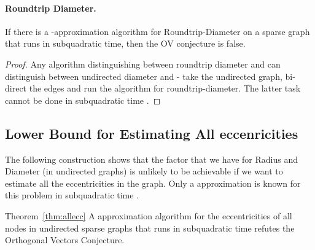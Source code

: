 \paragraph{Roundtrip Diameter.}

\begin{lemma}
\label{lem:RoundDiam}
If there is a -approximation algorithm for Roundtrip-Diameter on a sparse graph that runs in subquadratic time, then the OV conjecture is false.
\end{lemma}

\begin{proof}
Any algorithm distinguishing between roundtrip diameter  and  can distinguish between undirected diameter  and  - take the undirected graph, bi-direct the edges and run the algorithm for roundtrip-diameter.
The latter task cannot be done in subquadratic time \cite{RV13}.
\end{proof}







\subsection{Lower Bound for Estimating All eccenricities}


The following construction shows that the  factor that we have for Radius and Diameter (in undirected graphs) is unlikely to be achievable if we want to estimate all the eccentricities in the graph. 
Only a  approximation is known for this problem in subquadratic time \cite{diametersoda14}.

\begin{reminder}{Theorem~\ref{thm:allecc}}
 A  approximation algorithm for the eccentricities of all nodes in undirected sparse graphs that runs in subquadratic time refutes the Orthogonal Vectors Conjecture.
\end{reminder}

